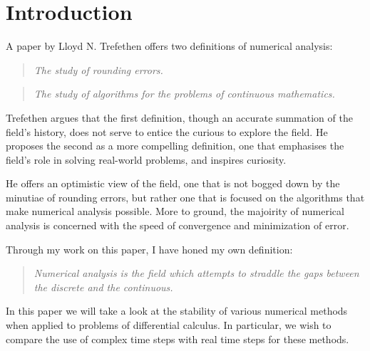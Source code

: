 \section{Introduction}
\par A paper by Lloyd N. Trefethen \cite{trefethen_definition} offers two definitions of numerical analysis:
\begin{quote}
    \textit{The study of rounding errors.}
\end{quote}
\begin{quote}
    \textit{The study of algorithms for the problems of continuous mathematics.}
\end{quote}

\par Trefethen argues that the first definition, though an accurate summation of the field's history, does not serve to entice the curious to explore the field. He proposes the second as a more compelling definition, one that emphasises the field's role in solving real-world problems, and inspires curiosity.

\par He offers an optimistic view of the field, one that is not bogged down by the minutiae of rounding errors, but rather one that is focused on the algorithms that make numerical analysis possible. More to ground, the majoirity of numerical analysis is concerned with the speed of convergence and minimization of error.

Through my work on this paper, I have honed my own definition:
\begin{quote}
	\textit{Numerical analysis is the field which attempts to straddle the gaps between the discrete and the continuous.}
\end{quote}

In this paper we will take a look at the stability of various numerical methods when applied to problems of differential calculus. In particular, we wish to compare the use of complex time steps with real time steps for these methods.
